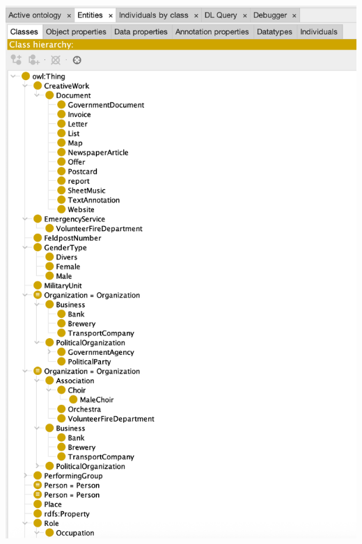 \documentclass[12pt, a4paper, ngerman, bidi=default]{article}
\begin{document}
  \begin{minipage}[t]{0.43\textwidth}
    \centering
    \vspace*{0.3cm} %
    \includegraphics[width=\linewidth]{assets/Images/Bildschirmfoto_ttl_ontologie_Ausschnitt.png}
    \label{fig:ttl-ontologie}
  \end{minipage}


\vspace{1em}
\end{document}
